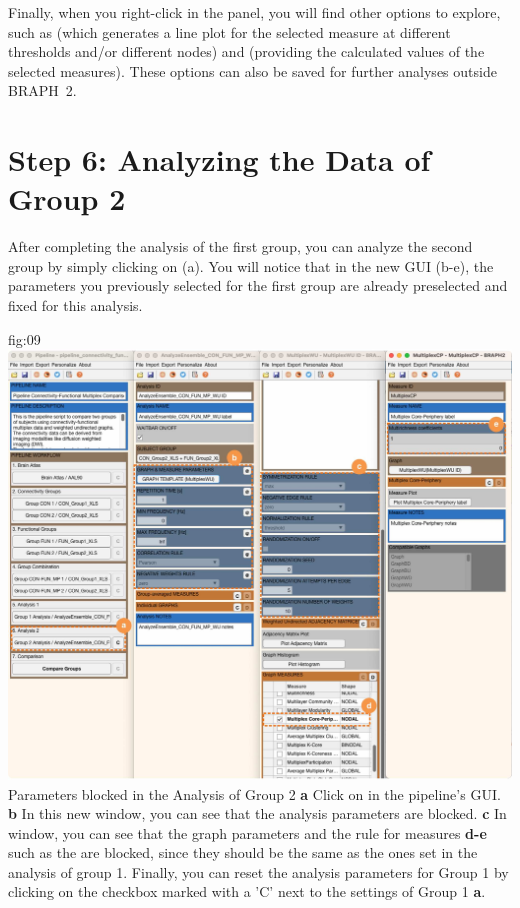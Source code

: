 \documentclass[justified]{tufte-handout}
\begin{document}
Finally, when you right-click in the  panel, you will find other options to explore, such as  (which generates a line plot for the selected measure at different thresholds and/or different nodes) and  (providing the calculated values of the selected measures). These options can also be saved for further analyses outside BRAPH~2.

\section{Step 6: Analyzing the Data of Group 2}

After completing the analysis of the first group, you can analyze the second group by simply clicking on  (a). You will notice that in the new GUI (b-e), the parameters you previously selected for the first group are already preselected and fixed for this analysis. 

	{fig:09}
	{\includegraphics{fig09.jpg}}
	{Parameters blocked in the Analysis of Group 2}
	{
	{\bf a} Click on  in the pipeline's GUI. 
	{\bf b} In this new window, you can see that the analysis parameters are blocked.
	{\bf c} In  window, you can see that the graph parameters and the rule for measures {\bf d-e} such as the  are blocked, since they should be the same as the ones set in the analysis of group 1. Finally, you can reset the analysis parameters for Group 1 by clicking on the checkbox marked with a 'C' next to the settings of Group 1 {\bf a}.
	}
\end{document}
